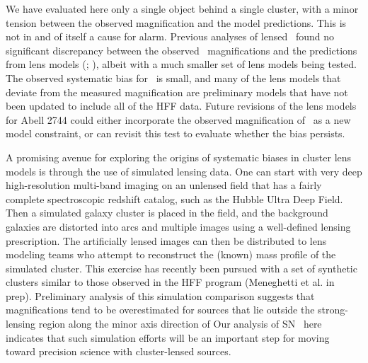 We have evaluated here only a single object behind a single cluster,
with a minor tension between the observed magnification and the model
predictions.  This is not in and of itself a cause for alarm.
Previous analyses of lensed \SNIa\ found no significant discrepancy
between the observed \SNIa\ magnifications and the predictions from
lens models (; \citealt{Nordin:2014}), albeit
with a much smaller set of lens models being tested.  The observed
systematic bias for \tomas\ is small, and many of the lens models that
deviate from the measured magnification are preliminary models that
have not been updated to include all of the HFF data.  Future
revisions of the lens models for Abell 2744 could either incorporate
the observed magnification of \tomas\ as a new model constraint, or
can revisit this test to evaluate whether the bias persists.

A promising avenue for exploring the origins of systematic biases in
cluster lens models is through the use of simulated lensing data.  One
can start with very deep high-resolution multi-band imaging on an
unlensed field that has a fairly complete spectroscopic redshift
catalog, such as the Hubble Ultra Deep Field.  Then a simulated galaxy
cluster is placed in the field, and the background galaxies are
distorted into arcs and multiple images using a well-defined lensing
prescription.  The artificially lensed images can then be distributed
to lens modeling teams who attempt to reconstruct the (known) mass
profile of the simulated cluster.  This exercise has recently been
pursued with a set of synthetic clusters similar to those observed in
the HFF program (Meneghetti et al. in prep).  Preliminary analysis of
this simulation comparison suggests that magnifications tend to be
overestimated for sources that lie outside the strong-lensing region
along the minor axis direction of  Our analysis of
SN \tomas\ here indicates that such simulation efforts  will be an important step for
moving toward precision science with cluster-lensed sources.

